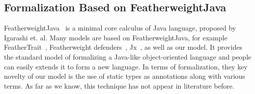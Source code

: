 \subsection{Formalization Based on FeatherweightJava}
FeatherweightJava~\cite{Igarashi01FJ} is a minimal core calculus of Java language, proposed by Igarashi et. al. Many models are based on 
FeatherweightJava, for example FeatherTrait~\cite{Liquori08ftj}, Featherweight defenders~\cite{goetz12fdefenders}, Jx~\cite{Nystrom2004}, as well as our model.
It provides the standard model of formalizing a Java-like object-oriented language and 
people can easily extends it to form a new language. In terms of formalization, they key novelty of our model is the use of 
static types as annotations along with various terms. As far as we know, this technique has not appear in literature before.








